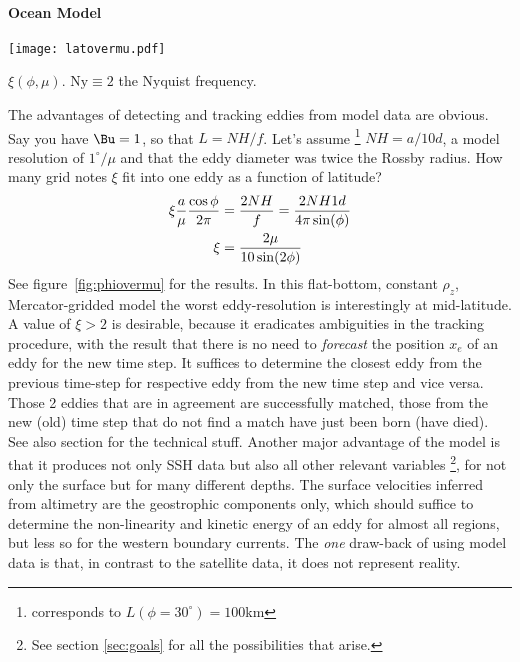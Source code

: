 \paragraph{Ocean Model}
\begin{marginfigure}
\texttt{[image: latovermu.pdf]}
\caption{$\xi(\phi,\mu)$. $\mathrm{Ny}\equiv 2$ \ie the Nyquist frequency.}
\label{fig:phiovermu}
\end{marginfigure}
The advantages of detecting and tracking eddies from model data are obvious.
Say you have $\Bu=1$, so that $L=NH/f$. Let's assume \footnote{corresponds to $L(\phi=30^{\circ})=100$km} $NH=a/10d$, a model resolution of $1^{\circ}/\mu$ and that the eddy diameter was twice the Rossby radius. How many grid notes $\xi$ fit into one eddy as a function of latitude?
\begin{align}
	\xi \frac{a}{\mu} \frac{\cos \phi}{2 \pi}
	&=
	\frac{2NH }{f} = \frac{2NH 1d}{4 \pi  \sin(\phi)}\notag\\
	\xi
	&=
	 \frac{ 2\mu }{10  \sin(2\phi)}
\end{align}
See figure~\ref{fig:phiovermu} for the results. In this flat-bottom, constant $\rho_z$, Mercator-gridded model the worst eddy-resolution is interestingly at
mid-latitude. A value of $\xi>2$ is desirable, because it eradicates ambiguities in the tracking procedure, with the result that there is no need to
\textit{forecast} the position $x_e$ of an eddy for the new time step. It suffices to determine the closest eddy from the previous time-step for respective eddy
from the new time step and vice versa. Those 2 eddies that are in agreement are successfully matched, those from the new (old) time step that do not find a
match have just been born (have died). See also section  for the technical stuff.
Another major advantage of the model is that it produces not only SSH data but also all other relevant variables \footnote{See section \ref{sec:goals} for all the
possibilities that arise.}, for not only the surface but for many different depths. The surface velocities inferred from altimetry are the geostrophic
components only, which should suffice to \eg determine the non-linearity and kinetic energy of an eddy for almost all regions, but less so for \eg the western
boundary currents.
The \emph{one} draw-back of using model data is that, in contrast to the satellite data, it does not represent reality.
